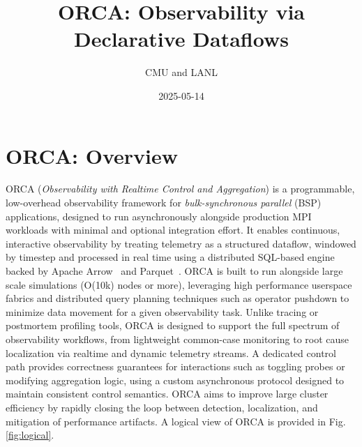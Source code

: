 \documentclass[ letterpaper, DIV=11, numbers=noendperiod]{scrartcl}
\title{ORCA: Observability via Declarative Dataflows}
\author{CMU and LANL}
\date{2025-05-14}
\begin{document}
\maketitle

\section{ORCA: Overview}\label{orca-overview}

ORCA (\emph{Observability with Realtime Control and Aggregation}) is a programmable, low-overhead observability framework for \emph{bulk-synchronous parallel} (BSP) applications, designed to run asynchronously alongside production MPI workloads with minimal and optional integration effort. It enables continuous, interactive observability by treating telemetry as a structured dataflow, windowed by timestep and processed in real time using a distributed SQL-based engine backed by Apache Arrow~\cite{:ApacheArrow} and Parquet~\cite{:ApacheParquet}.
ORCA is built to run alongside large scale simulations (O(10k) nodes or more), leveraging high performance userspace fabrics and distributed query planning techniques such as operator pushdown to minimize data movement for a given observability task.
Unlike tracing or postmortem profiling tools, ORCA is designed to support the full spectrum of observability workflows, from lightweight common-case monitoring to root cause localization via realtime and dynamic telemetry streams.
A dedicated control path provides correctness guarantees for interactions such as toggling probes or modifying aggregation logic, using a custom asynchronous protocol designed to maintain consistent control semantics.
ORCA aims to improve large cluster efficiency by rapidly closing the loop between detection, localization, and mitigation of performance artifacts. A logical view of ORCA is provided in Fig. \ref{fig:logical}.



%
%
\end{document}
